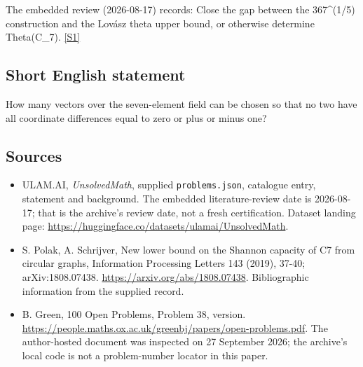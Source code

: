 \documentclass[11pt,a4paper]{article}
\newcommand{\sref}[2]{\hyperlink{source:#1:#2}{[S#2]}}
\begin{document}
The embedded review (2026-08-17) records: Close the gap between the 367\textasciicircum{}(1/5) construction and the Lovász theta upper bound, or otherwise determine Theta(C\_7). \sref{statement}{1}

\subsection{Short English statement}

How many vectors over the seven-element field can be chosen so that no two have all coordinate differences equal to zero or plus or minus one?

\subsection{Sources}

{\small

\begin{itemize}

\item[\hypertarget{source:statement:1}{S1}] ULAM.AI, \emph{UnsolvedMath}, supplied \texttt{problems.json}, catalogue entry, statement and background. The embedded literature-review date is 2026-08-17; that is the archive’s review date, not a fresh certification. Dataset landing page: \url{https://huggingface.co/datasets/ulamai/UnsolvedMath}.

\item[\hypertarget{source:statement:2}{S2}] S. Polak, A. Schrijver, New lower bound on the Shannon capacity of C7 from circular graphs, Information Processing Letters 143 (2019), 37-40; arXiv:1808.07438. \url{https://arxiv.org/abs/1808.07438}. Bibliographic information from the supplied record.

\item[\hypertarget{source:statement:3}{S3}] B. Green, 100 Open Problems, Problem 38, version. \url{https://people.maths.ox.ac.uk/greenbj/papers/open-problems.pdf}. The author-hosted document was inspected on 27 September 2026; the archive’s local code is not a problem-number locator in this paper.

\end{itemize}

}

\label{end:statement}
\end{document}
